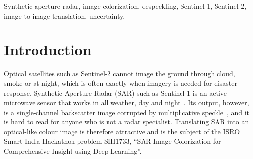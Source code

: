 \documentclass[conference]{IEEEtran}
\begin{document}
\begin{abstract}
Synthetic Aperture Radar (SAR) images the Earth through cloud and at night, but its single-channel, speckled backscatter
is hard for non-experts to interpret. We study SAR-to-optical colorization with a two-stage, physics-guided network.
Stage~1 is a log-domain (homomorphic) residual despeckler that is trained \emph{without clean references}. It is supervised
by a prior derived from the multiplicative speckle model: local radiometric preservation plus log-domain total variation.
Stage~2 is a U-Net colorizer with an ImageNet-pretrained ResNet-18 encoder and terrain-conditioned FiLM layers. We evaluate on
16{,}000 Sentinel-1/Sentinel-2 pairs with a \emph{scene-level} split, so no test scene is seen in training, and train nine
models (baselines and ablations) under an identical budget. On \nTest{} test tiles the final model reaches \psnrOursRBICondNoadv{}\,dB
PSNR and \ssimOursRBICondNoadv{} SSIM. That is \dFinalVsPix{}\,dB above Pix2Pix and \dFinalVsUnet{}\,dB above a U-Net regressor,
a difference that is statistically significant under a paired Wilcoxon test. The physics prior makes Stage~1 radiometrically
unbiased (mean of ratio \morOurs{} versus \morOursNophys{} without it). We also report three negative results: the adversarial loss
costs \dGanCost{}\,dB on unseen scenes; terrain conditioning does not transfer across scenes; and Monte Carlo dropout variance does
not rank pixel errors (Spearman correlation \uncRho{}). The absolute scores show that colorizing unseen scenes from
single-polarization SAR remains far from solved. Code, splits and evaluation scripts are released.
\end{abstract}

\begin{IEEEkeywords}
Synthetic aperture radar, image colorization, despeckling, Sentinel-1, Sentinel-2, image-to-image translation, uncertainty.
\end{IEEEkeywords}

\section{Introduction}
Optical satellites such as Sentinel-2 cannot image the ground through cloud, smoke or at night, which is often exactly when
imagery is needed for disaster response. Synthetic Aperture Radar (SAR) such as Sentinel-1 is an active microwave sensor
that works in all weather, day and night~\cite{torres2012s1}. Its output, however, is a single-channel backscatter image
corrupted by multiplicative speckle~\cite{goodman1976speckle}, and it is hard to read for anyone who is not a radar
specialist. Translating SAR into an optical-like colour image is therefore attractive and is the subject of the ISRO
Smart India Hackathon problem SIH1733, ``SAR Image Colorization for Comprehensive Insight using Deep Learning''.
\end{document}
